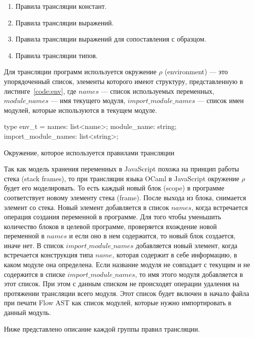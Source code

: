 \begin{enumerate}
\item Правила трансляции констант.
\item Правила трансляции выражений.
\item Правила трансляции выражений для сопоставления с образцом.
\item Правила трансляции типов.
\end{enumerate}

Для трансляции программ используется окружение $\rho$ (environment) --- это упорядоченный список, элементы которого имеют структуру, представленную в листинге~\ref{code:env}, где $names$ --- список используемых переменных, $module\_names$ --- имя текущего модуля, $import\_module\_names$ --- список имен модулей, которые используются в текущем модуле. 

\begin{listing}
\begin{pyglist}[language=ocaml,numbers=none,numbersep=5pt, fontsize=\small]
type env_t = {
  names: list<name>;
  module_name: string;
  import_module_names: list<string>;
}
\end{pyglist}
\caption{Окружение, которое используется правилами трансляции}
\label{code:env}
\end{listing}

Так как модель хранения переменных в JavaScript похожа на принцип работы стека (stack frames), то при трансляции языка OCaml в JavaScript окружение $\rho$ будет его моделировать. То есть каждый новый блок (scope) в программе соответствует новому элементу стека (frame). После выхода из блока, снимается элемент со стека. Новый элемент добавляется в список $names$, когда встречается операция создания переменной в программе. Для того чтобы уменьшить количество блоков в целевой программе, проверяется вхождение новой переменной в $names$ и если оно в нем содержится, то новый блок создается, иначе нет. В список $import\_module\_names$ добавляется новый элемент, когда встречается конструкция типа $name$, которая содержит в себе информацию, в каком модуле она определена. Если название модуля не совпадает с текущим и не содержится в списке $import\_module\_names$, то имя этого модуля добавляется в этот список. При этом с данным списком не происходят операции удаления на протяжении трансляции всего модуля. Этот список будет включен в начало файла при печати Flow AST как список модулей, которые нужно импортировать в данный модуль. 

Ниже представлено описание каждой группы правил трансляции. 

